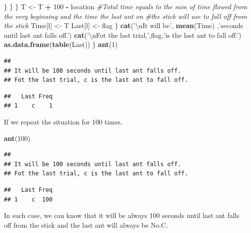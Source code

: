 \documentclass[]{article}
\newenvironment{Shaded}{\begin{snugshade}}{\end{snugshade}}
\newcommand{\KeywordTok}[1]{\textcolor[rgb]{0.13,0.29,0.53}{\textbf{#1}}}
\newcommand{\DecValTok}[1]{\textcolor[rgb]{0.00,0.00,0.81}{#1}}
\newcommand{\CharTok}[1]{\textcolor[rgb]{0.31,0.60,0.02}{#1}}
\newcommand{\StringTok}[1]{\textcolor[rgb]{0.31,0.60,0.02}{#1}}
\newcommand{\CommentTok}[1]{\textcolor[rgb]{0.56,0.35,0.01}{\textit{#1}}}
\newcommand{\OperatorTok}[1]{\textcolor[rgb]{0.81,0.36,0.00}{\textbf{#1}}}
\newcommand{\NormalTok}[1]{#1}
\begin{document}
\begin{Shaded}
\begin{Highlighting}[]
\NormalTok{        \}}
\NormalTok{      \}}
\NormalTok{    \}}
\NormalTok{  T <-}\StringTok{ }\NormalTok{T }\OperatorTok{+}\StringTok{ }\DecValTok{100} \OperatorTok{-}\StringTok{ }\NormalTok{location }\CommentTok{#Total time equals to the sum of time flowed from the very beginning and the time the last ant on }
                          \CommentTok{#the stick will use to fall off from the stick}
\NormalTok{  Time[l] <-}\StringTok{ }\NormalTok{T}
\NormalTok{  Last[l] <-}\StringTok{ }\NormalTok{flag}
\NormalTok{  \}}
  \KeywordTok{cat}\NormalTok{(}\StringTok{'}\CharTok{\textbackslash{}n}\StringTok{It will be'}\NormalTok{, }\KeywordTok{mean}\NormalTok{(Time) ,}\StringTok{'seconds until last ant falls off.'}\NormalTok{)}
  \KeywordTok{cat}\NormalTok{(}\StringTok{'}\CharTok{\textbackslash{}n}\StringTok{Fot the last trial,'}\NormalTok{,flag,}\StringTok{'is the last ant to fall off.'}\NormalTok{)}
  \KeywordTok{as.data.frame}\NormalTok{(}\KeywordTok{table}\NormalTok{(Last))}
\NormalTok{\}}
\KeywordTok{ant}\NormalTok{(}\DecValTok{1}\NormalTok{)}
\end{Highlighting}
\end{Shaded}

\begin{verbatim}
## 
## It will be 100 seconds until last ant falls off.
## Fot the last trial, c is the last ant to fall off.
\end{verbatim}

\begin{verbatim}
##   Last Freq
## 1    c    1
\end{verbatim}

If we repeat the situation for 100 times.

\begin{Shaded}
\begin{Highlighting}[]
\KeywordTok{ant}\NormalTok{(}\DecValTok{100}\NormalTok{)}
\end{Highlighting}
\end{Shaded}

\begin{verbatim}
## 
## It will be 100 seconds until last ant falls off.
## Fot the last trial, c is the last ant to fall off.
\end{verbatim}

\begin{verbatim}
##   Last Freq
## 1    c  100
\end{verbatim}

In such case, we can know that it will be always 100 seconds until last
ant falls off from the stick and the last ant will always be No.C.
\end{document}
